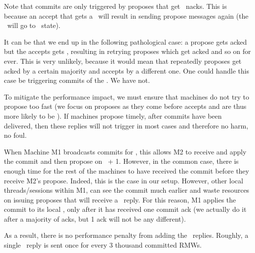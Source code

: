 Note that commits are only triggered by proposes that get \loghigh~nacks. This is because an accept that gets a \loghigh~will result in sending propose messages again (\ie the \locentry~will go to \retry~state).

It can be that we end up in the following pathological case: a propose gets acked but the accepts gets \loghigh, resulting in retrying proposes which get acked and so on for ever. This is very unlikely, because it would mean that repeatedly proposes get acked by a certain majority and accepts by a different one.
One could handle this case be triggering commits of the \comlogno. We have not. 

To mitigate the performance impact, we must ensure that machines do not try to propose too fast (we focus on proposes as they come before accepts and are thus more likely to be ).
If machines propose timely, after commits have been delivered, then these replies will not trigger in most cases  and therefore no harm, no foul.

When Machine M1 broadcasts commits for \lognox, this allows M2 to receive and apply the commit and then propose on \lognox~+ 1. However, in the common case, there is enough time for the rest of the machines to have received the commit before they receive M2's propose. Indeed, this is the case in our setup.
However, other local threads/sessions within M1, can see the commit much earlier and waste resources on issuing proposes that will receive a \loghigh~reply. 
For this reason, M1 applies the commit to its local \kv, only after it has received one commit ack (we actually do it after a majority of acks, but 1 ack will not be any different).

As a result, there is no performance penalty from adding the \loghigh~replies. Roughly, a single \loghigh~reply is sent once for every 3 thousand committed RMWs.






